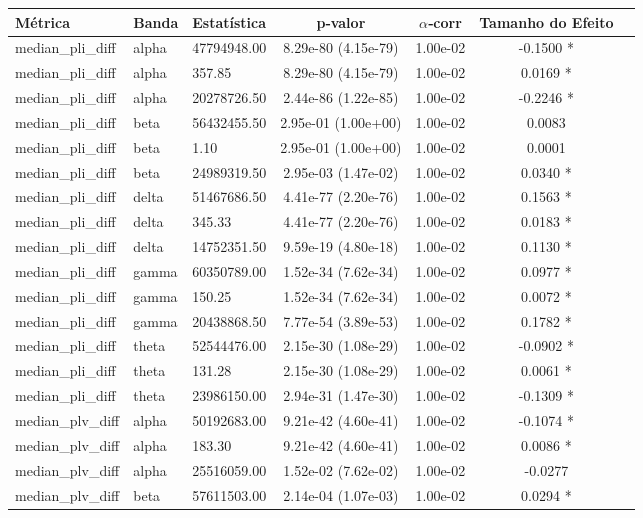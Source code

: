 \begin{tabular}{l l l c c c c}
    \toprule
    Métrica & Banda & Estatística & p‑valor & $\alpha$‑corr & Tamanho do Efeito \\
    \midrule
    median\_pli\_diff & alpha & 47794948.00 & 8.29e-80 (4.15e-79) & 1.00e-02 & -0.1500 * \\
    median\_pli\_diff & alpha & 357.85 & 8.29e-80 (4.15e-79) & 1.00e-02 & 0.0169 * \\
    median\_pli\_diff & alpha & 20278726.50 & 2.44e-86 (1.22e-85) & 1.00e-02 & -0.2246 * \\
    median\_pli\_diff & beta & 56432455.50 & 2.95e-01 (1.00e+00) & 1.00e-02 & 0.0083  \\
    median\_pli\_diff & beta & 1.10 & 2.95e-01 (1.00e+00) & 1.00e-02 & 0.0001  \\
    median\_pli\_diff & beta & 24989319.50 & 2.95e-03 (1.47e-02) & 1.00e-02 & 0.0340 * \\
    median\_pli\_diff & delta & 51467686.50 & 4.41e-77 (2.20e-76) & 1.00e-02 & 0.1563 * \\
    median\_pli\_diff & delta & 345.33 & 4.41e-77 (2.20e-76) & 1.00e-02 & 0.0183 * \\
    median\_pli\_diff & delta & 14752351.50 & 9.59e-19 (4.80e-18) & 1.00e-02 & 0.1130 * \\
    median\_pli\_diff & gamma & 60350789.00 & 1.52e-34 (7.62e-34) & 1.00e-02 & 0.0977 * \\
    median\_pli\_diff & gamma & 150.25 & 1.52e-34 (7.62e-34) & 1.00e-02 & 0.0072 * \\
    median\_pli\_diff & gamma & 20438868.50 & 7.77e-54 (3.89e-53) & 1.00e-02 & 0.1782 * \\
    median\_pli\_diff & theta & 52544476.00 & 2.15e-30 (1.08e-29) & 1.00e-02 & -0.0902 * \\
    median\_pli\_diff & theta & 131.28 & 2.15e-30 (1.08e-29) & 1.00e-02 & 0.0061 * \\
    median\_pli\_diff & theta & 23986150.00 & 2.94e-31 (1.47e-30) & 1.00e-02 & -0.1309 * \\
    median\_plv\_diff & alpha & 50192683.00 & 9.21e-42 (4.60e-41) & 1.00e-02 & -0.1074 * \\
    median\_plv\_diff & alpha & 183.30 & 9.21e-42 (4.60e-41) & 1.00e-02 & 0.0086 * \\
    median\_plv\_diff & alpha & 25516059.00 & 1.52e-02 (7.62e-02) & 1.00e-02 & -0.0277  \\
    median\_plv\_diff & beta & 57611503.00 & 2.14e-04 (1.07e-03) & 1.00e-02 & 0.0294 * \\

\end{tabular}
